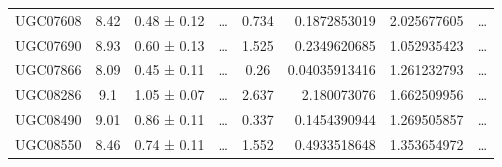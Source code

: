 \documentclass[reprint,%
 amsmath,amssymb,
 aps,
]{revtex4-1}
\begin{document}
\begin{table}[]
\begin{tabular}{cccccrrc}
\rowcolor[HTML]{F3F3F3} 
UGC07608             & 8.42                      & 0.48 ± 0.12           & …                      & 0.734                                                        & 0.1872853019                                                          & 2.025677605                                                           & …                                                             \\
\rowcolor[HTML]{F3F3F3} 
UGC07690             & 8.93                      & 0.60 ± 0.13           & …                      & 1.525                                                        & 0.2349620685                                                          & 1.052935423                                                           & …                                                             \\
\rowcolor[HTML]{F3F3F3} 
UGC07866             & 8.09                      & 0.45 ± 0.11           & …                      & 0.26                                                         & 0.04035913416                                                         & 1.261232793                                                           & …                                                             \\
\rowcolor[HTML]{F3F3F3} 
UGC08286             & 9.1                       & 1.05 ± 0.07           & …                      & 2.637                                                        & 2.180073076                                                           & 1.662509956                                                           & …                                                             \\
\rowcolor[HTML]{F3F3F3} 
UGC08490             & 9.01                      & 0.86 ± 0.11           & …                      & 0.337                                                        & 0.1454390944                                                          & 1.269505857                                                           & …                                                             \\
\rowcolor[HTML]{F3F3F3} 
UGC08550             & 8.46                      & 0.74 ± 0.11           & …                      & 1.552                                                        & 0.4933518648                                                          & 1.353654972                                                           & …                                                             \\

\end{tabular}
\end{table}
\end{document}
